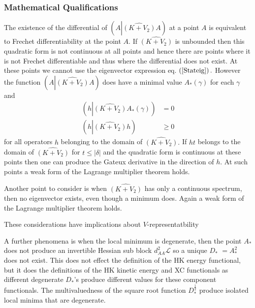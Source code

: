 \documentclass[aps,preprint]{revtex4}%
\begin{document}
\subsubsection{Mathematical Qualifications}

The existence of the differential of $\left(  A\left\vert \widehat{\left(
K+V_{2}\right)  }A\right.  \right)  $ at a point $A$ is equivalent to Frechet
differentiability at the point $A$. If $\widehat{\left(  K+V_{2}\right)  }$ is
unbounded then this quadratic form is not continuous at all points and hence
there are points where it is not Frechet differentiable and thus where the
differential does not exist. At these points we cannot use the eigenvector
expression eq. $\left(  \ref{Stateig}\right)  .$ However the function $\left(
A\left\vert \widehat{\left(  K+V_{2}\right)  }A\right.  \right)  $ does have a
minimal value $A_{\ast}\left(  \gamma\right)  $ for each $\gamma$ and
\begin{align}
\left(  h\left\vert \widehat{\left(  K+V_{2}\right)  }A_{\ast}\left(
\gamma\right)  \right.  \right)   &  =0\\
\left(  h\left\vert \widehat{\left(  K+V_{2}\right)  }h\right.  \right)   &
\geq0
\end{align}
for all operators $h$ belonging to the domain of $\widehat{\left(
K+V_{2}\right)  }.$ If $ht$ belongs to the domain of $\widehat{\left(
K+V_{2}\right)  }$ for $t\leq\left\vert \delta\right\vert $ and the quadratic
form is continuous at these points then one can produce the Gateux derivative
in the direction of $h.$ At such points a weak form of the Lagrange multiplier
theorem holds.

Another point to consider is when $\widehat{\left(  K+V_{2}\right)  }$ has
only a continuous spectrum, then no eigenvector exists, even though a minimum
does. Again a weak form of the Lagrange multiplier theorem holds.

These considerations have implications about $V$-representatbility \cite{Vrep}

A further phenomena is when the local minimum is degenerate, then the point
$A_{\ast}$ does not produce an invertible Hessian sub block $d_{AA}%
^{2}\mathcal{L}$ so a unique $D_{\ast}$ $=A_{\ast}^{2}$ does not exist. This
does not effect the definition of the HK energy functional, but it does the
definitions of the HK kinetic energy and XC functionals as different
degenerate $D_{\ast}$'s produce different values for these component
functionals. The multivaluedness of the square root function $D_{\ast}%
^{\frac{1}{2}}$ produce isolated local minima that are degenerate.
\end{document}
